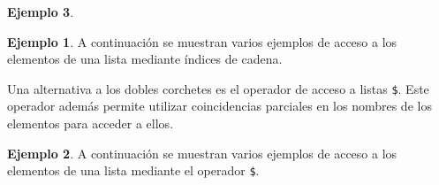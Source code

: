 \documentclass[
]{book}
\newenvironment{Shaded}{\begin{snugshade}}{\end{snugshade}}
\newcommand{\CommentTok}[1]{\textcolor[rgb]{0.56,0.35,0.01}{\textit{#1}}}
\newcommand{\DecValTok}[1]{\textcolor[rgb]{0.00,0.00,0.81}{#1}}
\newcommand{\FunctionTok}[1]{\textcolor[rgb]{0.00,0.00,0.00}{#1}}
\newcommand{\NormalTok}[1]{#1}
\newcommand{\OtherTok}[1]{\textcolor[rgb]{0.56,0.35,0.01}{#1}}
\newcommand{\StringTok}[1]{\textcolor[rgb]{0.31,0.60,0.02}{#1}}
\theoremstyle{definition}
\theoremstyle{definition}
\newtheorem{example}{Ejemplo}[chapter]
\theoremstyle{definition}
\theoremstyle{definition}
\theoremstyle{remark}
\begin{document}
\begin{example}
\begin{example}
A continuación se muestran varios ejemplos de acceso a los elementos de una lista mediante índices de cadena.

\begin{Shaded}
\end{Shaded}

\end{example}

Una alternativa a los dobles corchetes es el operador de acceso a listas \texttt{\$}. Este operador además permite utilizar coincidencias parciales en los nombres de los elementos para acceder a ellos.

\begin{example}

A continuación se muestran varios ejemplos de acceso a los elementos de una lista mediante el operador \texttt{\$}.


\end{example}
\end{example}
\end{document}
